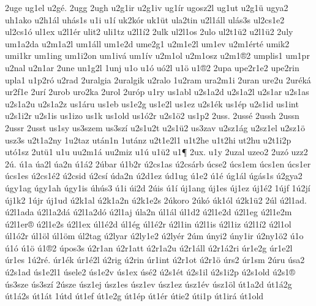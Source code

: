 {2uge
ug1el
u2g^^e9.
2ugg
2ugh
u2g1ir
u2g1iv
ug1^^edr
ugosz2l
ug1ut
u2g1^^fc
ugya2
uh1ako
u2h1^^e1l
uh^^e1s1s
u1i
u1^^ed
uk2k^^f3r
uk1^^fct
ula2tin
u2l1^^e1ll
ul^^e1s3s
ul2cs1e2
ul2cs1^^f3
ul1ex
u2l1^^e9r
ulit2
uli1tz
u2l1^^ed2
2ulk
ul2l1os
2ulo
ul2t1^^fc2
u2l1^^fc2
2uly
um1a2da
u2m1a2l
um1^^e1ll
um1e2d
ume2g1
u2m1e2l
um1ev
u2m1^^e9rt^^e9
umik2
umi1kr
um1ing
um1i2on
um1iv^^e1
um1^^edv
u2m1ol
u2m1osz
u2m1^^ae2
umplis1
um1pr
u2nal
u2n1ar
2une
un1g2l
1unj
u1o
u1^^f3
u^^f32l
u1^^f6
u1^^ae2
2upa
upe2r1e2
upe2rin
upla1
u1p2r^^f3
u2rad
2uralgia
2uralgik
u2ralo
1u2ram
ura2m1i
2uran
ure2u
2ur^^e9k^^e1
ur2f1e
2ur^^ed
2urob
uro2ka
2urol
2ur^^f3p
u1ry
us1abl
u2s1a2d
u2s1a2l
u2s1ar
u2s1as
u2s1a2u
u2s1a2z
us1^^e1ru
us1eb
us1e2g
us1e2l
us1ez
u2s1^^e9k
us1^^e9p
u2s1id
us1int
u2s1i2r
u2s1is
us1izo
us1k
us1old
us1^^f32r
u2s1^^f62
us1p2
2uss.
2uss^^e9
2ussh
2ussn
2ussr
2usst
us1sy
us3szem
us3sz^^ed
u2s1u2t
u2s1^^fc2
us3zav
u2sz1^^e1g
u2sz1el
u2sz1^^f6
usz3s
u2t1a2ny
1u2taz
ut^^e1n1n
1ut^^e1nz
u2t1e2l1
u1t2he
u1t2hi
ut2hu
u2t1i2p
ut^^f31sz
2ut^^fc1
u1u
uu2m1^^e1
uu2miz
u1^^fa
u1^^fc2
u1^^b6
2ux.
u1y
2uzal
uzeo2
2uz^^f3
uzz2
2^^fa.
^^fa1a
^^faa2l
^^faa2n
^^fa1^^e12
2^^fabar
^^fa1b2r
^^fa2cs1as
^^fa2cs^^e1rb
^^facse2
^^facs1em
^^facs1en
^^facs1er
^^facs1es
^^fa2cs1^^e92
^^fa2csid
^^fa2cs^^ed
^^fada2n
^^fa2d1ez
^^fad1ug
^^fa1e2
^^fa1^^e9
^^fag1^^e1l
^^fag^^e1s1s
^^fa2gya2
^^fagy1ag
^^fagy1ah
^^fagy1is
^^fah^^fas3
^^fa1i
^^fai2d
2^^fais
^^fa1^^ed
^^faj1ang
^^faj1es
^^faj1ez
^^faj1^^e92
1^^fajf
1^^fa2j^^ed
^^faj1k2
1^^fajr
^^faj1ud
^^fa2k1al
^^fa2k1a2n
^^fa2k1e2s
2^^fakoro
2^^fak^^f3
^^fak1^^f3l
^^fa2k1^^fc2
2^^fal
^^fa2l1ad.
^^fa2l1ada
^^fa2l1a2d^^e1
^^fa2l1a2d^^f3
^^fa2l1aj
^^fala2n
^^fal1^^e1l
^^fal1d2
^^fa2l1e2d
^^fa2l1eg
^^fa2l1e2m
^^fa2l1er^^ae
^^fa2l1e2s
^^fa2l1ex
^^fal1^^e92d
^^fal1^^e9g
^^fal1^^e92r
^^fa2l1in
^^fa2l1is
^^fa2l1iz
^^fa2l1^^ed2
^^fa2l1ol
^^fal1^^f32r
^^fal1^^f6l
^^fal1^^f6m
^^fal2tag
^^fa2lyar
^^fa2ly1e2
^^fa2ly^^e9r
2^^fam
^^fanyi2
^^fany1ir
^^fa2ny1^^f62
^^fa1o
^^fa1^^f3
^^fa1^^f6
^^fa1^^ae2
^^fapos3s
^^fa2r1an
^^fa2r1att
^^fa2r1a2u
^^fa2r1^^e1ll
^^fa2r1^^e12ri
^^far1e2g
^^far1e2l
^^far1es
1^^fa2r^^e9.
^^far1^^e9k
^^far1^^e92l
^^fa2rig
^^fa2rin
^^far1int
^^fa2r1ot
^^fa2r1^^f6
^^fars2
^^far1sm
2^^faru
^^fasa2
^^fa2s1ad
^^fas1e2l1
^^fasele2
^^fas1e2v
^^fas1ex
^^fas^^e92
^^fa2s1^^e9t
^^fa2s1il
^^fa2s1i2p
^^fa2s1old
^^fa2s1^^ae
^^fas3sze
^^fas3sz^^ed
2^^fasze
^^fasz1ej
^^fasz1es
^^fasz1ev
^^fasz1ez
^^fasz1^^e9v
^^fasz1^^f6l
^^fat1a2d
^^fat1^^e12g
^^fat1^^e12s
^^fat1^^e1t
1^^fatd
^^fat1ef
^^fat1e2g
^^fat1^^e9p
^^fat1^^e9r
^^fatie2
^^fati1p
^^fat1ir^^e1
^^fat1old
}
